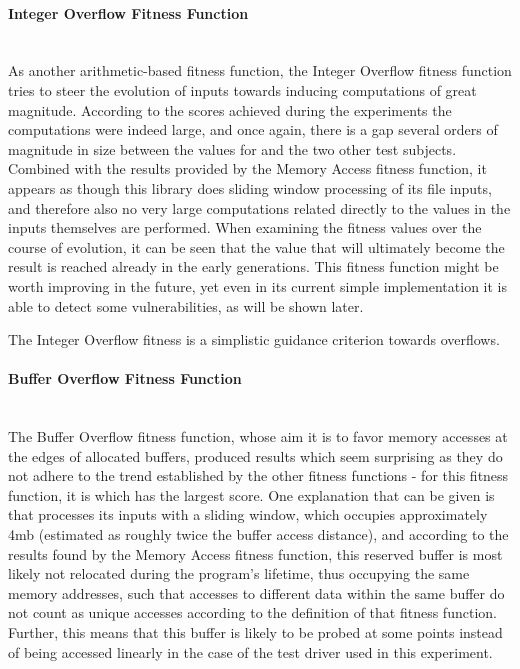 \paragraph{Integer Overflow Fitness Function} ~\\
As another arithmetic-based fitness function, the Integer Overflow fitness function tries to steer the
evolution of inputs towards inducing computations of great magnitude. According to the scores achieved during
the experiments the computations were indeed large, and once again, there is a gap several orders of
magnitude in size between the values for \libpcap and the two other test subjects. Combined with the
results provided by the Memory Access fitness function, it appears as though this library does sliding window
processing of its file inputs, and therefore also no very large computations related directly to the values in
the inputs themselves are performed. When examining the fitness values over the course of evolution, it can
be seen that the value that will ultimately become the result is reached already in the early generations.
This fitness function might be worth improving in the future, yet even in its current simple implementation it
is able to detect some vulnerabilities, as will be shown later.

\begin{mdframed}
\centering
The Integer Overflow fitness is a simplistic guidance criterion towards overflows.
\end{mdframed}

\paragraph{Buffer Overflow Fitness Function} ~\\
The Buffer Overflow fitness function, whose aim it is to favor memory accesses at the edges of allocated
buffers, produced results which seem surprising as they do not adhere to the trend established by the other
fitness functions - for this fitness function, it is \libpcap which has the largest score. One explanation
that can be given is that \libpcap processes its inputs with a sliding window, which occupies approximately
4mb (estimated as roughly twice the buffer access distance), and according to the results found by the Memory
Access fitness function, this reserved buffer is most likely not relocated during the program's lifetime, thus
occupying the same memory addresses, such that accesses to different data within the same buffer do not count
as unique accesses according to the definition of that fitness function. Further, this means that this buffer
is likely to be probed at some points instead of being accessed linearly in the case of the test driver used
in this experiment. 

